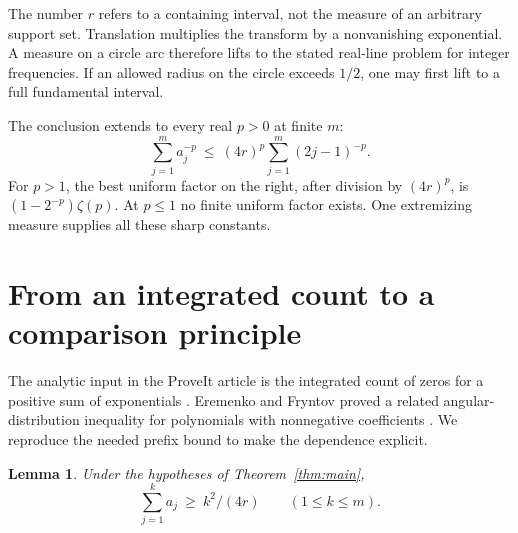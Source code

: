 \documentclass[11pt]{article}
\newtheorem{lemma}[theorem]{Lemma}
\begin{document}
The number $r$ refers to a containing interval, not the measure of an arbitrary support set. Translation multiplies the transform by a nonvanishing exponential. A measure on a circle arc therefore lifts to the stated real-line problem for integer frequencies. If an allowed radius on the circle exceeds $1/2$, one may first lift to a full fundamental interval.

The conclusion extends to every real $p>0$ at finite $m$:
\begin{equation}\label{eq:p}
 \sum_{j=1}^m a_j^{-p}\ \le\ (4r)^p\sum_{j=1}^m(2j-1)^{-p}.
\end{equation}
For $p>1$, the best uniform factor on the right, after division by $(4r)^p$, is $(1-2^{-p})\zeta(p)$. At $p\le1$ no finite uniform factor exists. One extremizing measure supplies all these sharp constants.

\section{From an integrated count to a comparison principle}

The analytic input in the ProveIt article is the integrated count of zeros for a positive sum of exponentials \cite{ProveIt}. Eremenko and Fryntov proved a related angular-distribution inequality for polynomials with nonnegative coefficients \cite{EF}. We reproduce the needed prefix bound to make the dependence explicit.

\begin{lemma}\label{lem:prefix}
Under the hypotheses of Theorem~\ref{thm:main},
\[
 \sum_{j=1}^k a_j\ \ge\ k^2/(4r)\qquad(1\le k\le m).
\]
\end{lemma}
\end{document}
